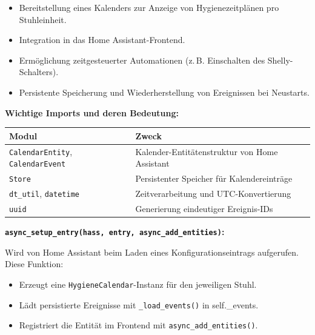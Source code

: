 \begin{itemize}
  \item Bereitstellung eines Kalenders zur Anzeige von Hygienezeitplänen pro Stuhleinheit.\\
  \item Integration in das Home Assistant-Frontend.\\
  \item Ermöglichung zeitgesteuerter Automationen (z.\,B. Einschalten des Shelly-Schalters).\\
  \item Persistente Speicherung und Wiederherstellung von Ereignissen bei Neustarts.
\end{itemize}

\vspace{0.5cm}

\textbf{Wichtige Imports und deren Bedeutung:}

\begin{tabular}{|p{5.5cm}|p{8.5cm}|}
\hline
\textbf{Modul} & \textbf{Zweck} \\
\hline
\texttt{CalendarEntity}, \texttt{CalendarEvent} & Kalender-Entitätenstruktur von Home Assistant \\
\texttt{Store} & Persistenter Speicher für Kalendereinträge \\
\texttt{dt\_util}, \texttt{datetime} & Zeitverarbeitung und UTC-Konvertierung \\
\texttt{uuid} & Generierung eindeutiger Ereignis-IDs \\
\hline
\end{tabular}

\vspace{0.5cm}

\textbf{\texttt{async\_setup\_entry(hass, entry, async\_add\_entities)}:}

Wird von Home Assistant beim Laden eines Konfigurationseintrags aufgerufen. Diese Funktion:

\begin{itemize}
  \item Erzeugt eine \texttt{HygieneCalendar}-Instanz für den jeweiligen Stuhl.\\
  \item Lädt persistierte Ereignisse mit \texttt{\_load\_events()} in self.\_events.\\
  \item Registriert die Entität im Frontend mit \texttt{async\_add\_entities()}.
\end{itemize}

